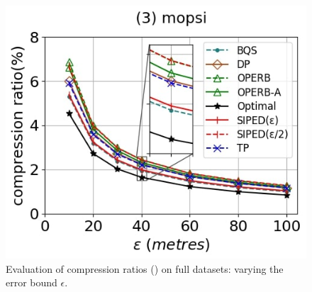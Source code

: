 \begin{figure}[tb!]
	\includegraphics[scale=0.250]{Figures/Exp-PED-CR-epsilon-mopsi.jpg}		
	\vspace{-2ex}
	\caption{\small Evaluation of compression ratios (\ped) on full datasets: varying the error bound $\epsilon$.}
	\label{fig:cr-ped-epsilon}
	\vspace{-2ex}
\end{figure}
